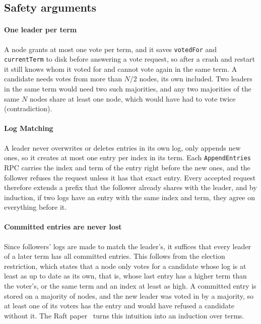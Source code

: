 \documentclass[conference]{IEEEtran}
\begin{document}
\subsection{Safety arguments}\label{sec:correct-safety}

\paragraph{One leader per term} A node grants at most one vote per term, and it saves \texttt{votedFor} and \texttt{currentTerm} to disk before answering a vote request,
so after a crash and restart it still knows whom it voted for and cannot vote again in the same term. A candidate needs votes from more than $N/2$ nodes, its own included.
Two leaders in the same term would need two such majorities, and any two majorities of the same $N$ nodes share at least one node, which would have had to vote twice (contradiction).

\paragraph{Log Matching} A leader never overwrites or deletes entries in its own log, only appends new ones, so it creates at most one entry per index in its term.
Each \texttt{AppendEntries} RPC carries the index and term of the entry right before the new ones, and the follower refuses the request unless it has that exact entry.
Every accepted request therefore extends a prefix that the follower already shares with the leader, and by induction, if two logs have an entry with the same index and term,
they agree on everything before it.

\paragraph{Committed entries are never lost} Since followers' logs are made to match the leader's, it suffices that every leader of a later term has all committed entries.
This follows from the election restriction, which states that a node only votes for a candidate whose log is at least as up to date as its own, that is, whose last entry has a higher term than the voter's,
or the same term and an index at least as high. A committed entry is stored on a majority of nodes, and the new leader was voted in by a majority,
so at least one of its voters has the entry and would have refused a candidate without it. The Raft paper~\cite{raft2014} turns this intuition into an induction over terms.
\end{document}
